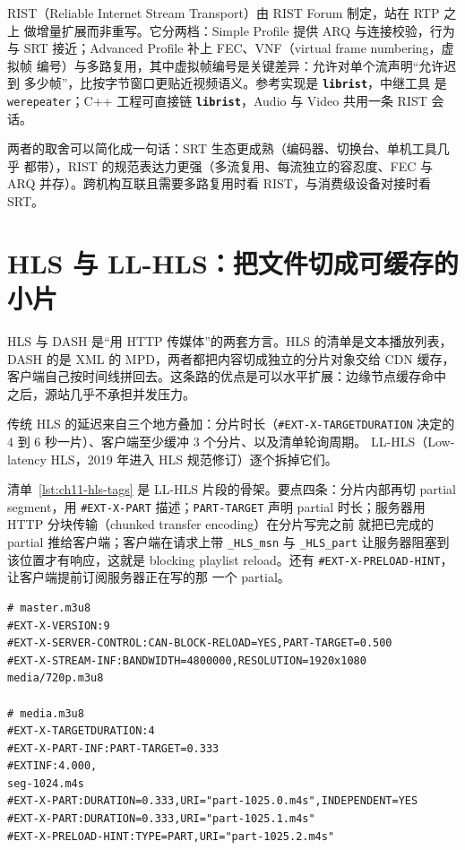 \documentclass[12pt,a4paper,fontset=fandol]{ctexbook}
\newcommand{\Tp}[1]{\texttt{#1}}
\newcommand{\Lib}[1]{\textbf{\texttt{#1}}}
\newcommand{\Lang}[1]{\textsf{#1}}
\newcommand{\CPP}{\Lang{C++}}
\newcommand{\DomAud}{\Lang{Audio}}
\newcommand{\DomVid}{\Lang{Video}}
\begin{document}
RIST（Reliable Internet Stream Transport）由 RIST Forum 制定，站在 RTP 之上
做增量扩展而非重写。它分两档：Simple Profile 提供 ARQ 与连接校验，行为与
SRT 接近；Advanced Profile 补上 FEC、VNF（virtual frame numbering，虚拟帧
编号）与多路复用，其中虚拟帧编号是关键差异：允许对单个流声明``允许迟到
多少帧''，比按字节窗口更贴近视频语义。参考实现是 \Lib{librist}，中继工具
是 \Tp{werepeater}；\CPP{} 工程可直接链 \Lib{librist}，\DomAud{} 与
\DomVid{} 共用一条 RIST 会话。

两者的取舍可以简化成一句话：SRT 生态更成熟（编码器、切换台、单机工具几乎
都带），RIST 的规范表达力更强（多流复用、每流独立的容忍度、FEC 与 ARQ
并存）。跨机构互联且需要多路复用时看 RIST，与消费级设备对接时看 SRT。

\section{HLS 与 LL-HLS：把文件切成可缓存的小片}

HLS 与 DASH 是``用 HTTP 传媒体''的两套方言。HLS 的清单是文本播放列表，
DASH 的是 XML 的 MPD，两者都把内容切成独立的分片对象交给 CDN 缓存，
客户端自己按时间线拼回去。这条路的优点是可以水平扩展：边缘节点缓存命中
之后，源站几乎不承担并发压力。

传统 HLS 的延迟来自三个地方叠加：分片时长（\Tp{\#EXT-X-TARGETDURATION}
决定的 4 到 6 秒一片）、客户端至少缓冲 3 个分片、以及清单轮询周期。
LL-HLS（Low-latency HLS，2019 年进入 HLS 规范修订）逐个拆掉它们。

清单~\ref{lst:ch11-hls-tags} 是 LL-HLS 片段的骨架。要点四条：分片内部再切
partial segment，用 \Tp{\#EXT-X-PART} 描述；\Tp{PART-TARGET} 声明 partial
时长；服务器用 HTTP 分块传输（chunked transfer encoding）在分片写完之前
就把已完成的 partial 推给客户端；客户端在请求上带 \Tp{\_HLS\_msn} 与
\Tp{\_HLS\_part} 让服务器阻塞到该位置才有响应，这就是 blocking playlist
reload。还有 \Tp{\#EXT-X-PRELOAD-HINT}，让客户端提前订阅服务器正在写的那
一个 partial。

\begin{lstlisting}[style=shellstyle,caption={LL-HLS 主清单与媒体清单中的关键标签},label={lst:ch11-hls-tags}]
# master.m3u8
#EXT-X-VERSION:9
#EXT-X-SERVER-CONTROL:CAN-BLOCK-RELOAD=YES,PART-TARGET=0.500
#EXT-X-STREAM-INF:BANDWIDTH=4800000,RESOLUTION=1920x1080
media/720p.m3u8

# media.m3u8
#EXT-X-TARGETDURATION:4
#EXT-X-PART-INF:PART-TARGET=0.333
#EXTINF:4.000,
seg-1024.m4s
#EXT-X-PART:DURATION=0.333,URI="part-1025.0.m4s",INDEPENDENT=YES
#EXT-X-PART:DURATION=0.333,URI="part-1025.1.m4s"
#EXT-X-PRELOAD-HINT:TYPE=PART,URI="part-1025.2.m4s"
\end{lstlisting}
\end{document}
